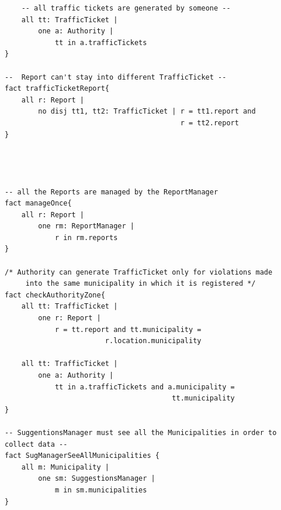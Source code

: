 \begin{verbatim}
	-- all traffic tickets are generated by someone --
	all tt: TrafficTicket |
		one a: Authority |
			tt in a.trafficTickets
}

--  Report can't stay into different TrafficTicket --
fact trafficTicketReport{
	all r: Report |
		no disj tt1, tt2: TrafficTicket | r = tt1.report and
		                                  r = tt2.report
}




-- all the Reports are managed by the ReportManager
fact manageOnce{
	all r: Report | 
		one rm: ReportManager | 
			r in rm.reports
}

/* Authority can generate TrafficTicket only for violations made
     into the same municipality in which it is registered */
fact checkAuthorityZone{
	all tt: TrafficTicket |
		one r: Report |
			r = tt.report and tt.municipality =
				        r.location.municipality

	all tt: TrafficTicket |
		one a: Authority |
			tt in a.trafficTickets and a.municipality =
			                            tt.municipality
}

-- SuggentionsManager must see all the Municipalities in order to collect data --
fact SugManagerSeeAllMunicipalities {
	all m: Municipality |
		one sm: SuggestionsManager |
			m in sm.municipalities
}

\end{verbatim}

\newpage

